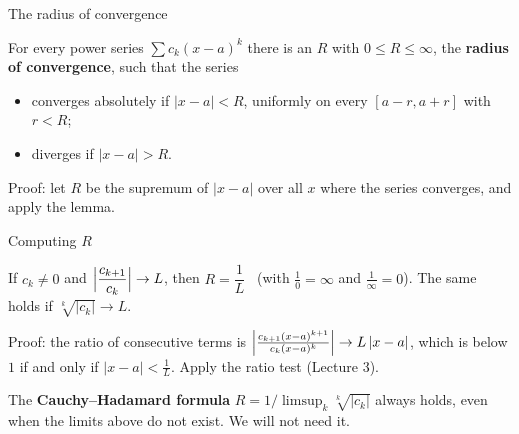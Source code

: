 \documentclass[10pt]{wosm-slides}
\begin{document}
\begin{frame}{The radius of convergence}
  \begin{theorem}
    For every power series $\sum c_k (x - a)^k$ there is an $R$ with $0 \le R \le \infty$,
    the \textbf{radius of convergence}, such that the series
    \begin{itemize}
      \item converges absolutely if $|x - a| < R$, uniformly on every $[a - r, a + r]$ with $r < R$;
      \item diverges if $|x - a| > R$.
    \end{itemize}
  \end{theorem}
  {\small Proof: let $R$ be the supremum of $|x - a|$ over all $x$ where the series converges,
  and apply the lemma.\par}
  \pause
  {\centering
  \par}
\end{frame}

\begin{frame}{Computing $R$}
  \begin{theorem}
    If $c_k \ne 0$ and $\Bigl|\dfrac{c_{k+1}}{c_k}\Bigr| \to L$, then $R = \dfrac1L$
    \ (with $\frac10 = \infty$ and $\frac1\infty = 0$).
    The same holds if $\sqrt[k]{|c_k|} \to L$.
  \end{theorem}
  {\small Proof: the ratio of consecutive terms is
  $\Bigl|\frac{c_{k+1}(x-a)^{k+1}}{c_k (x-a)^k}\Bigr| \to L\,|x - a|$, which is below $1$ if and
  only if $|x - a| < \frac1L$. Apply the ratio test (Lecture 3).\par}
  \pause
  \begin{remark}
    The \textbf{Cauchy--Hadamard formula} $R = 1 / \limsup_k \sqrt[k]{|c_k|}$ always holds,
    even when the limits above do not exist. We will not need it.
  \end{remark}
\end{frame}
\end{document}
